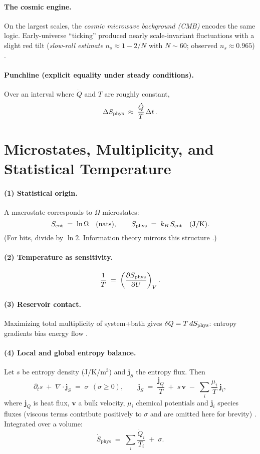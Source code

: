 \paragraph{The cosmic engine.}
On the largest scales, the \emph{cosmic microwave background (CMB)} encodes the same logic. Early-universe ``ticking'' produced nearly scale-invariant fluctuations with a slight red tilt (\emph{slow-roll estimate} \(n_s\!\approx\!1-2/N\) with \(N\!\sim\!60\); observed \(n_s\!\approx\!0.965\)) \cite{peebles1993principles,planck2018params}.

\paragraph{Punchline (explicit equality under steady conditions).}
Over an interval where \(\dot Q\) and \(T\) are roughly constant,
\[
\Delta S_{\mathrm{phys}} \;\approx\; \frac{\dot Q}{T}\,\Delta t\,.
\]

\section*{Microstates, Multiplicity, and Statistical Temperature}

\paragraph{(1) Statistical origin.}
A macrostate corresponds to \(\Omega\) microstates:
\[
S_{\mathrm{ent}} \;=\; \ln\Omega\quad\text{(nats)},\qquad
S_{\mathrm{phys}} \;=\; k_B\,S_{\mathrm{ent}}\quad\text{(J/K)}.
\]
(For bits, divide by \(\ln 2\). Information theory mirrors this structure \cite{shannon1948mathematical}.)

\paragraph{(2) Temperature as sensitivity.}
\[
\frac{1}{T} \;=\; \left(\frac{\partial S_{\mathrm{phys}}}{\partial U}\right)_V .
\]

\paragraph{(3) Reservoir contact.}
Maximizing total multiplicity of system+\!bath gives \(\delta Q=T\,dS_{\mathrm{phys}}\): entropy gradients bias energy flow \cite{callen1985thermodynamics}.

\paragraph{(4) Local and global entropy balance.}
Let \(s\) be entropy density (J/K/m\(^3\)) and \(\mathbf j_S\) the entropy flux. Then
\[
\partial_t s \;+\; \nabla\!\cdot\!\mathbf j_S \;=\; \sigma\ \ (\sigma\ge 0),
\qquad
\mathbf j_S\;=\;\frac{\mathbf j_Q}{T}\;+\;s\,\mathbf v\;-\;\sum_i \frac{\mu_i}{T}\,\mathbf j_i,
\]
where \(\mathbf j_Q\) is heat flux, \(\mathbf v\) a bulk velocity, \(\mu_i\) chemical potentials and \(\mathbf j_i\) species fluxes (viscous terms contribute positively to \(\sigma\) and are omitted here for brevity) \cite{callen1985thermodynamics}. Integrated over a volume:
\[
\dot{S}_{\mathrm{phys}} \;=\; \sum_i \frac{\dot Q_i}{T_i} \;+\; \sigma.
\]

